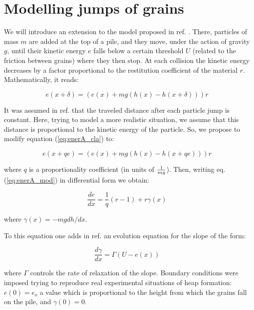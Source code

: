 \section{Modelling jumps of grains}

We will introduce an extension to the model proposed in ref.
\cite{Grasselli_98}. There, particles of mass $m$ are added at the top of
a pile, and they move, under the action of gravity $g$, 
until their kinetic energy $e$ falls below a certain
threshold $U$ (related to the friction between grains) 
where they then stop. At each collision the kinetic energy decreases
by a factor proportional to the restitution coefficient of the
material $r$. Mathematically, it reads:

\begin{equation}
e(x+ \delta)=(e(x)+mg(h(x)-h(x+\delta)))r \label{eq:enerA_cla}
\end{equation}

It was assumed in ref. \cite{Grasselli_98} that the traveled distance
after each particle jump is constant. Here, trying to model a more
realistic situation, we assume that this distance
is proportional to the kinetic energy of the particle. 
So, we propose to modify equation (\ref{eq:enerA_cla}) to:

\begin{equation}
e(x+ qe)=(e(x)+mg(h(x)-h(x+qe)))r \label{eq:enerA_mod}
\end{equation}

\noindent where $q$ is a proportionality coefficient (in units of
$1\over mg$). Then,
writing eq. (\ref{eq:enerA_mod}) in differential form we obtain:

\begin{equation}
\frac{de}{dx}=\frac{1}{q}(r-1)+r \gamma(x) \label{eq:enerA_diff}
\end{equation}

\noindent where $\gamma(x)=-mgdh/dx$.

To this equation one adds in ref.\cite{Grasselli_98} an
evolution equation for the slope of the form:

\begin{equation}
\frac{d \gamma}{dx}=\Gamma (U-e(x)) \label{eq:angA_diff}
\end{equation}

\noindent where $\Gamma$ controls the rate of relaxation of the slope.
Boundary conditions were imposed trying to reproduce
real experimental situations of heap formation:
 $e(0)=e_o$ a value which is proportional to
the height from which the grains fall on the pile, and $\gamma(0)=0$.

